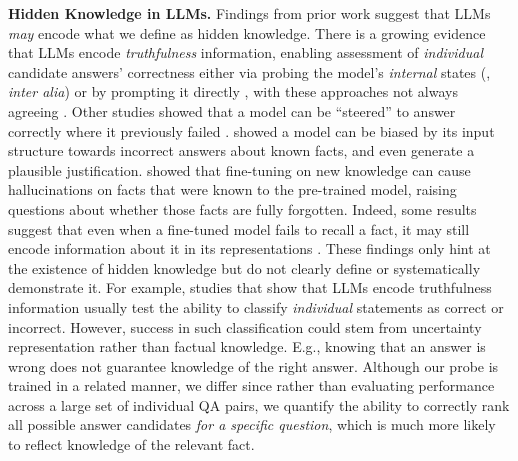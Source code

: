 \textbf{Hidden Knowledge in LLMs.}
Findings from prior work suggest that LLMs \textit{may} encode what we define as hidden knowledge. 
There is a growing evidence that LLMs encode \textit{truthfulness} information, enabling assessment of \textit{individual} candidate answers' correctness either via probing the model's \textit{internal} states (\citealp{DBLP:conf/iclr/BurnsYKS23, DBLP:conf/emnlp/AzariaM23,marks2024the}, \textit{inter alia}) or by prompting it directly \citep{lin2022tmlr, kadavath2022language,tian2023emnlp}, with these approaches not always agreeing \citep{liu-etal-2023-cognitive}. 
Other studies showed that a model can be ``steered'' to answer correctly where it previously failed \citep{DBLP:conf/nips/0002PVPW23,zhang2024acl, tulchinskii2024listening, rimsky-etal-2024-steering}. \citet{turpin2023language} showed a model can be biased by its input structure towards incorrect answers about known facts, and even generate a plausible justification. \citet{gekhman-etal-2024-fine} showed that fine-tuning on new knowledge can cause hallucinations on facts that were known to the pre-trained model, raising questions about whether those facts are fully forgotten.
Indeed, some results suggest that even when a fine-tuned model fails to recall a fact, it may still encode information about it in its representations \citep{gottesman-geva-2024-estimating,patil2024iclr}.
These findings only hint at the existence of hidden knowledge but do not clearly define or systematically demonstrate it.
For example, studies that show that LLMs encode truthfulness information usually test the ability to classify \emph{individual} statements as correct or incorrect. However, success in such classification could 
stem from uncertainty representation rather than factual knowledge.
E.g., knowing that an answer is wrong does not guarantee knowledge of the right answer. 
Although our probe is trained in a related manner, we differ since rather than evaluating performance across a large set of individual QA pairs, we quantify the ability to correctly rank 
all possible answer candidates \textit{for a specific question}, which is much more likely to reflect knowledge of the relevant fact.


